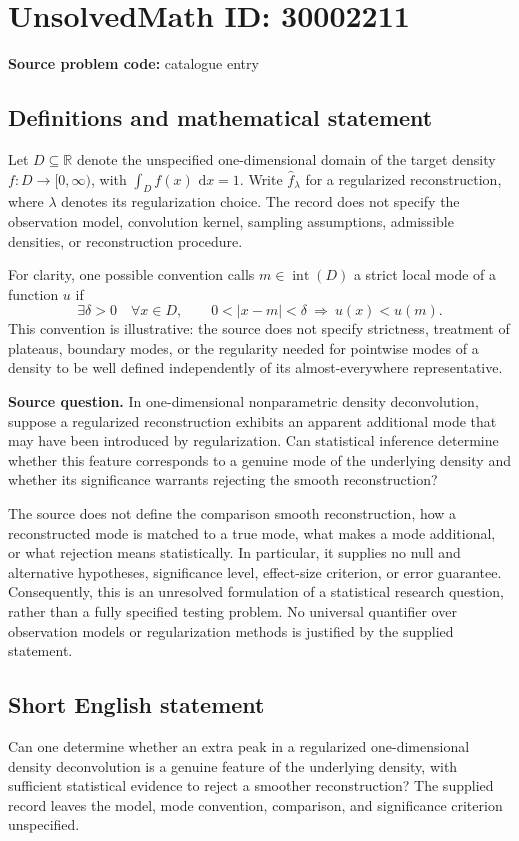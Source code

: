 \documentclass[11pt]{article}
\newcommand{\R}{\mathbb{R}}
\newcommand{\dd}{\,\mathrm{d}}
\begin{document}
\section*{UnsolvedMath ID: 30002211}
\textbf{Source problem code:} catalogue entry
\subsection{Definitions and mathematical statement}
Let \(D\subseteq\R\) denote the unspecified one-dimensional domain of the target density \(f:D\to[0,\infty)\), with \(\int_D f(x)\,\dd x=1\). Write \(\widehat f_\lambda\) for a regularized reconstruction, where \(\lambda\) denotes its regularization choice. The record does not specify the observation model, convolution kernel, sampling assumptions, admissible densities, or reconstruction procedure.

For clarity, one possible convention calls \(m\in\operatorname{int}(D)\) a strict local mode of a function \(u\) if
\[
\exists\delta>0\quad\forall x\in D,\qquad 0<|x-m|<\delta\ \Longrightarrow\ u(x)<u(m).
\]
This convention is illustrative: the source does not specify strictness, treatment of plateaus, boundary modes, or the regularity needed for pointwise modes of a density to be well defined independently of its almost-everywhere representative.

\textbf{Source question.} In one-dimensional nonparametric density deconvolution, suppose a regularized reconstruction exhibits an apparent additional mode that may have been introduced by regularization. Can statistical inference determine whether this feature corresponds to a genuine mode of the underlying density and whether its significance warrants rejecting the smooth reconstruction?

The source does not define the comparison smooth reconstruction, how a reconstructed mode is matched to a true mode, what makes a mode additional, or what rejection means statistically. In particular, it supplies no null and alternative hypotheses, significance level, effect-size criterion, or error guarantee. Consequently, this is an unresolved formulation of a statistical research question, rather than a fully specified testing problem. No universal quantifier over observation models or regularization methods is justified by the supplied statement.
\subsection{Short English statement}
Can one determine whether an extra peak in a regularized one-dimensional density deconvolution is a genuine feature of the underlying density, with sufficient statistical evidence to reject a smoother reconstruction? The supplied record leaves the model, mode convention, comparison, and significance criterion unspecified.
\end{document}

